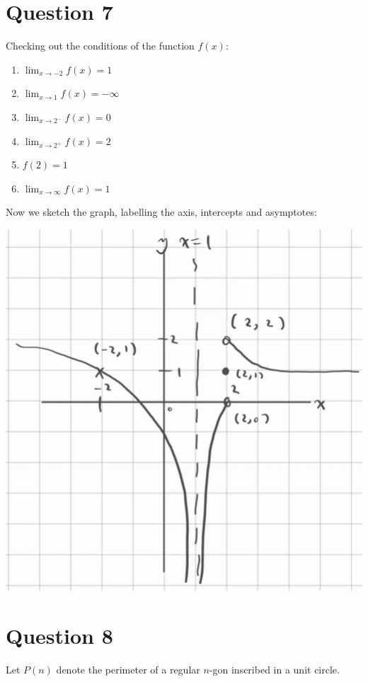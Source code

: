 \documentclass{article}
\begin{document}
\section*{Question 7}
\begin{minipage}{0.7\textwidth}
    Checking out the conditions of the function $f(x)$:
    \begin{enumerate}
        \item $\lim_{x\to -2}f(x)=1$
        \item $\lim_{x\to 1}f(x)=-\infty$
        \item $\lim_{x\to 2^-}f(x)=0$
        \item $\lim_{x\to 2^+}f(x)=2$
        \item $f(2)=1$
        \item $\lim_{x\to \infty}f(x)=1$
    \end{enumerate}
    Now we sketch the graph, labelling the axis, intercepts and asymptotes:
\end{minipage}
\begin{minipage}{0.3\textwidth}
    \includegraphics[width=\textwidth]{A1Q7.png}
\end{minipage}

\section*{Question 8}
Let $P(n)$ denote the perimeter of a regular $n$-gon inscribed in a unit circle.
\end{document}
